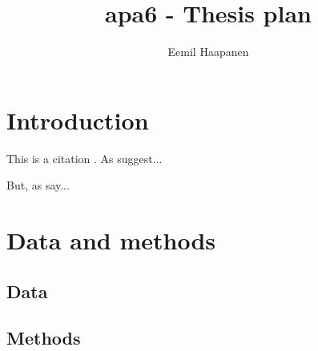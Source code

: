 \documentclass{article}
\title{apa6 - Thesis plan}
\author{Eemil Haapanen}
\begin{document}
\maketitle

\section{Introduction}
This is a citation \parencite{hu2019}.
As \citeauthor{hu2019} suggest...

But, as \textcite{hu2019} say...

\section{Data and methods}

\subsection{Data}
\subsection{Methods}

\printbibliography
\end{document}
